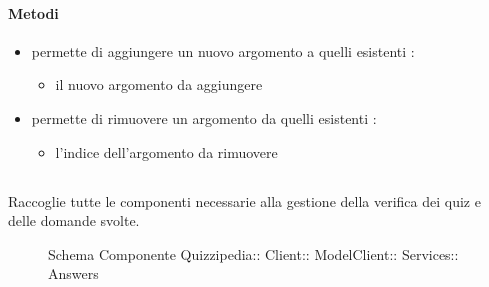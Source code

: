 \paragraph{Metodi}
\begin{itemize}
\item {}
\newline
permette di aggiungere un nuovo argomento a quelli esistenti
\newline
{} :
\begin{itemize}
\item {}
\newline
il nuovo argomento da aggiungere
\end{itemize}
\item {}
\newline
permette di rimuovere un argomento da quelli esistenti
\newline
{} :
\begin{itemize}
\item {}
\newline
l'indice dell'argomento da rimuovere
\end{itemize}
\end{itemize}
\subsection{}
Raccoglie tutte le componenti necessarie alla gestione della verifica dei quiz e delle domande svolte.
\begin{figure}[H]
\centering
\noindent{}
\caption[Schema Componente Quizzipedia::Client::ModelClient::Services::Answers]{Schema Componente Quizzipedia:: Client:: ModelClient:: Services:: Answers}
\end{figure}
